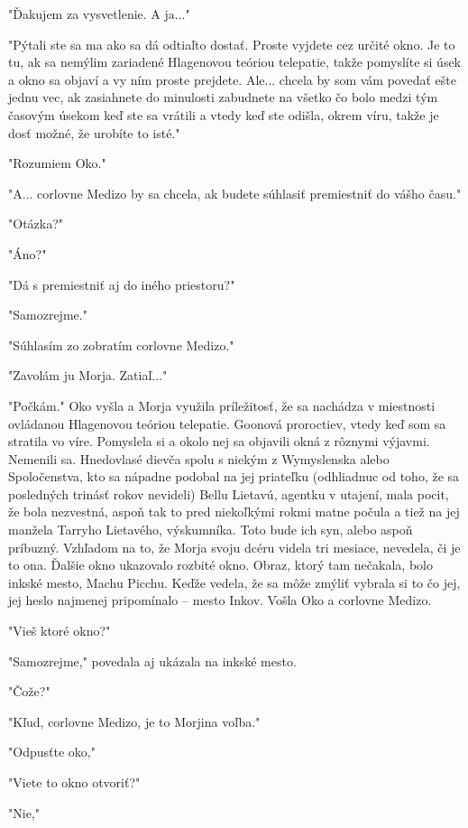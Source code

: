 \documentclass{book}
\begin{document}
"$ $Ďakujem za vysvetlenie. A ja..."

"$ $Pýtali ste sa ma ako sa dá odtiaľto dostať. Proste vyjdete cez určité okno. Je to tu, ak sa nemýlim zariadené Hlagenovou teóriou telepatie, takže pomyslíte si úsek a okno sa objaví a vy ním proste prejdete. Ale... chcela by som vám povedať ešte jednu vec, ak zasiahnete do minulosti zabudnete na všetko čo bolo medzi tým časovým úsekom keď ste sa vrátili a vtedy keď ste odišla, okrem víru, takže je dosť možné, že urobíte to isté."

"$ $Rozumiem Oko."

"$ $A... corlovne Medizo by sa chcela, ak budete súhlasiť premiestniť do vášho času."

"$ $Otázka?"

"$ $Áno?"

"$ $Dá s premiestniť aj do iného priestoru?"

"$ $Samozrejme."

"$ $Súhlasím zo zobratím corlovne Medizo."

"$ $Zavolám ju Morja. Zatiaľ..."

"$ $Počkám."$ $ Oko vyšla a Morja využila príležitosť, že sa nachádza v miestnosti ovládanou Hlagenovou teóriou telepatie. Goonová proroctiev, vtedy keď som sa stratila vo víre. Pomyslela si a okolo nej sa objavili okná z rôznymi výjavmi. Nemenili sa. Hnedovlasé dievča spolu s niekým z Wymyslenska alebo Spoločenstva, kto sa nápadne podobal na jej priateľku (odhliadnuc od toho, že sa posledných trinásť rokov nevideli) Bellu Lietavú, agentku v utajení, mala pocit, že bola nezvestná, aspoň tak to pred niekoľkými rokmi matne počula a tiež na jej manžela Tarryho Lietavého, výskumníka. Toto bude ich syn, alebo aspoň príbuzný. Vzhľadom na to, že Morja svoju dcéru videla tri mesiace, nevedela, či je to ona. Ďalšie okno ukazovalo rozbité okno. Obraz, ktorý tam nečakala, bolo inkské mesto, Machu Picchu. Keďže vedela, že sa môže zmýliť vybrala si to čo jej, jej heslo najmenej pripomínalo – mesto Inkov. Vošla Oko a corlovne Medizo.

"$ $Vieš ktoré okno?"

"$ $Samozrejme,"$ $ povedala aj ukázala na inkské mesto.

"$ $Čože?"

"$ $Kľud, corlovne Medizo, je to Morjina voľba."

"$ $Odpusťte oko,"

"$ $Viete to okno otvoriť?"

"$ $Nie,"
\end{document}
